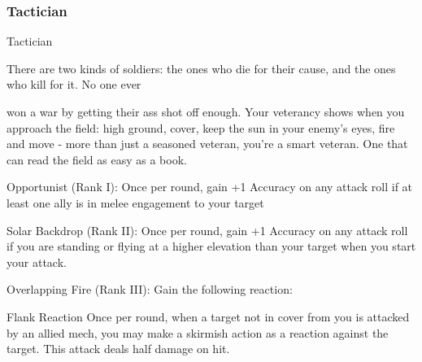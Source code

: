 \subsubsection{Tactician}

                                                   Tactician

There are two kinds of soldiers: the ones who die for their cause, and the ones who kill for it. No one ever

won a war by getting their ass shot off enough. Your veterancy shows when you approach the field: high
ground, cover, keep the sun in your enemy’s eyes, fire and move - more than just a seasoned veteran,
you’re a smart veteran. One that can read the field as easy as a book.


Opportunist (Rank I): Once per round, gain +1 Accuracy on any attack roll if at least one ally is
in melee engagement to your target

Solar Backdrop (Rank II): Once per round, gain +1 Accuracy on any attack roll if you are
standing or flying at a higher elevation than your target when you start your attack.

Overlapping Fire (Rank III): Gain the following reaction:





	        Flank
         Reaction
         Once per round, when a target not in cover from you is attacked by an allied mech, you
         may make a skirmish action as a reaction against the target. This attack deals half
         damage on hit.